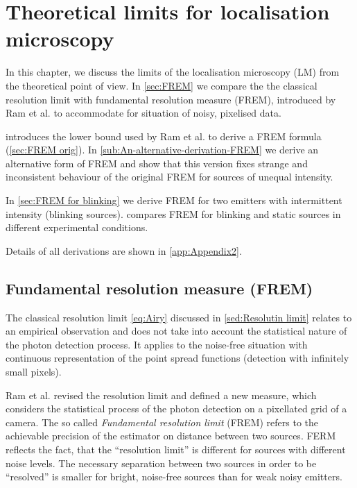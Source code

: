 \chapter{Theoretical limits for localisation microscopy \label{sec:Theoretical-limits-of the LM}}

In this chapter, we discuss the limits of the localisation microscopy (LM) from the theoretical point of view. In \autoref{sec:FREM} we compare the the classical resolution limit with fundamental resolution measure (FREM), introduced by Ram et al. \cite{Ram2006} to accommodate for situation of noisy, pixelised data. 

 introduces the \CR lower bound used by Ram et al. to derive a FREM formula (\autoref{sec:FREM orig}). In \autoref{sub:An-alternative-derivation-FREM} we derive an alternative form of FREM and show that this version fixes strange and inconsistent behaviour of the original FREM for sources of unequal intensity.

In \autoref{sec:FREM for blinking} we derive FREM for two emitters with intermittent intensity (blinking sources).  compares FREM for blinking and static sources in different experimental conditions.

Details of all derivations are shown in \autoref{app:Appendix2}.

\section{Fundamental resolution measure (FREM)\label{sec:FREM}}

The classical resolution limit \autoref{eq:Airy} discussed in \autoref{sed:Resolutin limit} relates to an empirical observation and does not take into account the statistical nature of the photon detection process. It applies to the noise-free situation with continuous representation of the point spread functions (detection with infinitely small pixels).

Ram et al. \cite{Ram2006,Ram2006b} revised the resolution limit and defined a new measure, which considers the statistical process of the photon detection on a pixellated grid of a camera. The so called \emph{Fundamental resolution limit} (FREM) refers to the achievable precision of the estimator on distance between two sources. FERM reflects the fact, that the ``resolution limit'' is different for sources with different noise levels. The necessary separation between two sources in order to be ``resolved'' is smaller for bright, noise-free sources than for weak noisy emitters.

